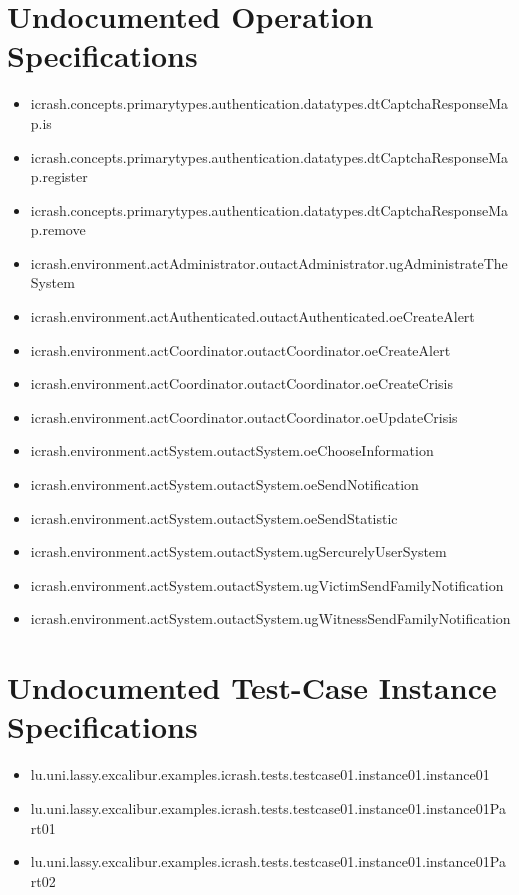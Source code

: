 \section[Undocumented Operation Specifications]{Undocumented Operation Specifications}
\begin{itemize}
\item icrash.concepts.primarytypes.authentication.datatypes.dtCaptchaResponseMap.is 
\item icrash.concepts.primarytypes.authentication.datatypes.dtCaptchaResponseMap.register 
\item icrash.concepts.primarytypes.authentication.datatypes.dtCaptchaResponseMap.remove 
\item icrash.environment.actAdministrator.outactAdministrator.ugAdministrateTheSystem 
\item icrash.environment.actAuthenticated.outactAuthenticated.oeCreateAlert 
\item icrash.environment.actCoordinator.outactCoordinator.oeCreateAlert 
\item icrash.environment.actCoordinator.outactCoordinator.oeCreateCrisis 
\item icrash.environment.actCoordinator.outactCoordinator.oeUpdateCrisis 
\item icrash.environment.actSystem.outactSystem.oeChooseInformation 
\item icrash.environment.actSystem.outactSystem.oeSendNotification 
\item icrash.environment.actSystem.outactSystem.oeSendStatistic 
\item icrash.environment.actSystem.outactSystem.ugSercurelyUserSystem 
\item icrash.environment.actSystem.outactSystem.ugVictimSendFamilyNotification 
\item icrash.environment.actSystem.outactSystem.ugWitnessSendFamilyNotification 
\end{itemize}





\section[Undocumented Test-Case Instance Specifications]{Undocumented Test-Case Instance Specifications}
\begin{itemize}
\item lu.uni.lassy.excalibur.examples.icrash.tests.testcase01.instance01.instance01 
\item lu.uni.lassy.excalibur.examples.icrash.tests.testcase01.instance01.instance01Part01 
\item lu.uni.lassy.excalibur.examples.icrash.tests.testcase01.instance01.instance01Part02 
\end{itemize}



